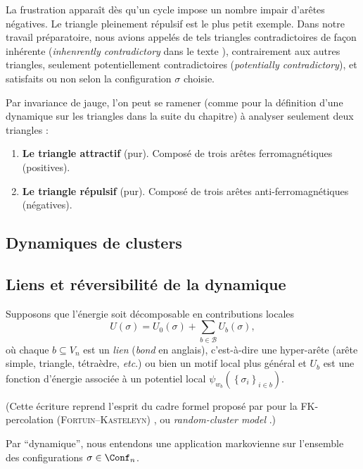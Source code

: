La frustration apparaît dès qu'un cycle impose un nombre impair d'arêtes négatives. Le triangle pleinement répulsif est le plus petit exemple. Dans notre travail préparatoire, nous avions appelés de tels triangles contradictoires de façon inhérente (\emph{inhenrently contradictory} dans le texte \cite{BibiMonterey}), contrairement aux autres triangles, seulement potentiellement contradictoires (\emph{potentially contradictory}), et satisfaits ou non selon la configuration $\sigma$ choisie.

Par invariance de jauge, l'on peut se ramener (comme pour la définition d'une dynamique sur les triangles dans la suite du chapitre) à analyser seulement deux triangles :
\begin{enumerate}
    \item \textbf{Le triangle attractif} (pur). Composé de trois arêtes ferromagnétiques (positives).
    \item \textbf{Le triangle répulsif} (pur). Composé de trois arêtes anti-ferromagnétiques (négatives).
\end{enumerate}

\subsection{Dynamiques de clusters}
\label{sec:chapII_cluster_abstrait}

\subsection{Liens et réversibilité de la dynamique}

Supposons que l'énergie soit décomposable en contributions locales
\begin{equation}
    U(\sigma)=U_0(\sigma)+\sum_{b\in\mathcal B}U_b(\sigma),
    \label{eq:chapII_lien_decomposition}
\end{equation}
où chaque $b\subseteq V_n$ est un \emph{lien} (\emph{bond} en anglais), c'est-à-dire une hyper-arête (arête simple, triangle, tétraèdre, \emph{etc}.) ou bien un motif local plus général et $U_b$ est une fonction d'énergie associée à un potentiel local $\psi_{w_b}\left( \left\{ \sigma_i\right\}_{i \in b}\right)$.

(Cette écriture reprend l'esprit du cadre formel proposé par \ES{} \cite{EdwardsSokal} pour la FK-percolation (\textsc{Fortuin--Kasteleyn}) \cite{FortuinKasteleyn}, ou  \emph{random-cluster model}  \cite{Grimmett2006}.)

Par ``dynamique'', nous entendons une application markovienne sur l'ensemble des configurations $\sigma \in \Conf_n$.

